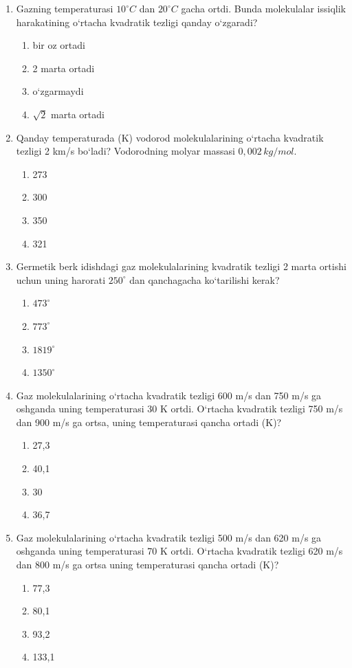 \begin{enumerate}
\item Gazning temperaturasi $10^\circ C$ dan $20^\circ C$ gacha ortdi. Bunda molekulalar issiqlik harakatining o‘rtacha kvadratik tezligi qanday o‘zgaradi?
\begin{enumerate}[label=\Alph*)]
\item bir oz ortadi
\item 2 marta ortadi
\item o‘zgarmaydi
\item $\sqrt{2}$ marta ortadi
\end{enumerate}

\item Qanday temperaturada (K) vodorod molekulalarining o‘rtacha kvadratik tezligi 2 km/s bo‘ladi? Vodorodning molyar massasi $0,002 \, kg/mol$.
\begin{enumerate}[label=\Alph*)]
\item 273
\item 300
\item 350
\item 321
\end{enumerate}

\item Germetik berk idishdagi gaz molekulalarining kvadratik tezligi 2 marta ortishi uchun uning harorati $250^\circ$ dan qanchagacha ko‘tarilishi kerak?
\begin{enumerate}[label=\Alph*)]
\item $473^\circ$
\item $773^\circ$
\item $1819^\circ$
\item $1350^\circ$
\end{enumerate}

\item Gaz molekulalarining o‘rtacha kvadratik tezligi 600 m/s dan 750 m/s ga oshganda uning temperaturasi 30 K ortdi. O‘rtacha kvadratik tezligi 750 m/s dan 900 m/s ga ortsa, uning temperaturasi qancha ortadi (K)?
\begin{enumerate}[label=\Alph*)]
\item 27,3
\item 40,1
\item 30
\item 36,7
\end{enumerate}

\item Gaz molekulalarining o‘rtacha kvadratik tezligi 500 m/s dan 620 m/s ga oshganda uning temperaturasi 70 K ortdi. O‘rtacha kvadratik tezligi 620 m/s dan 800 m/s ga ortsa uning temperaturasi qancha ortadi (K)?
\begin{enumerate}[label=\Alph*)]
\item 77,3
\item 80,1
\item 93,2
\item 133,1
\end{enumerate}


\end{enumerate}
